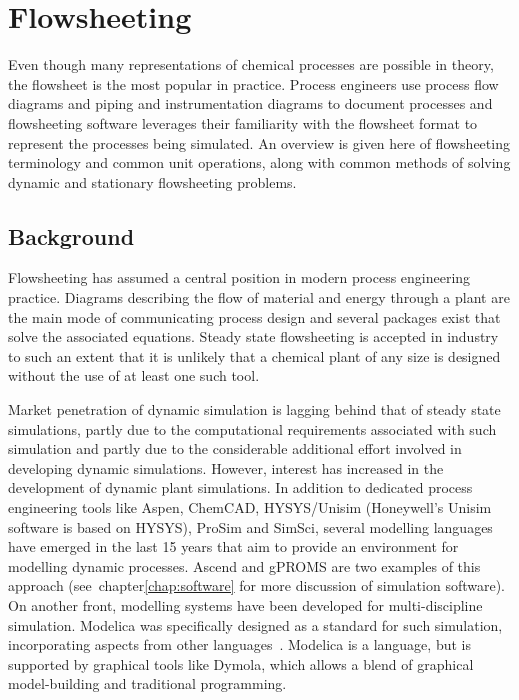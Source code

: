 \chapter{Flowsheeting}

\begin{overview}
  Even though many representations of chemical processes are possible
  in theory, the flowsheet is the most popular in practice.  Process
  engineers use process flow diagrams and piping and instrumentation
  diagrams to document processes and flowsheeting software leverages
  their familiarity with the flowsheet format to represent the
  processes being simulated.  An overview is given here of
  flowsheeting terminology and common unit operations, along with
  common methods of solving dynamic and stationary flowsheeting
  problems.
\end{overview}

\section{Background}
Flowsheeting has assumed a central position in modern process engineering practice.  
Diagrams describing the flow of material and energy through a plant are the main mode of communicating process design and several packages exist that solve the associated equations.
Steady state flowsheeting is accepted in industry to such an extent that it is unlikely that a chemical plant of any size is designed without the use of at least one such tool.~\citep{glasscock.hale1994process}

Market penetration of dynamic simulation is lagging behind that of steady state simulations, partly due to the computational requirements associated with such simulation and partly due to the considerable additional effort involved in developing dynamic simulations.
However, interest has increased in the development of dynamic plant simulations.  
In addition to dedicated process engineering tools like Aspen, ChemCAD, HYSYS/Unisim (Honeywell's Unisim software is based on HYSYS), ProSim and SimSci, several modelling languages have emerged in the last 15 years that aim to provide an environment for modelling dynamic processes.  
Ascend and gPROMS are two examples of this approach (see~chapter\ref{chap:software} for more discussion of simulation software). 
On another front, modelling systems have been developed for multi-discipline simulation.  
Modelica was specifically designed as a standard for such simulation, incorporating aspects from other languages~\citep{elmqvist.ab1997modelica,tiller.ph-d-2001introduction}.  
Modelica is a language, but is supported by graphical tools like Dymola, which allows a blend of graphical model-building and traditional programming.

